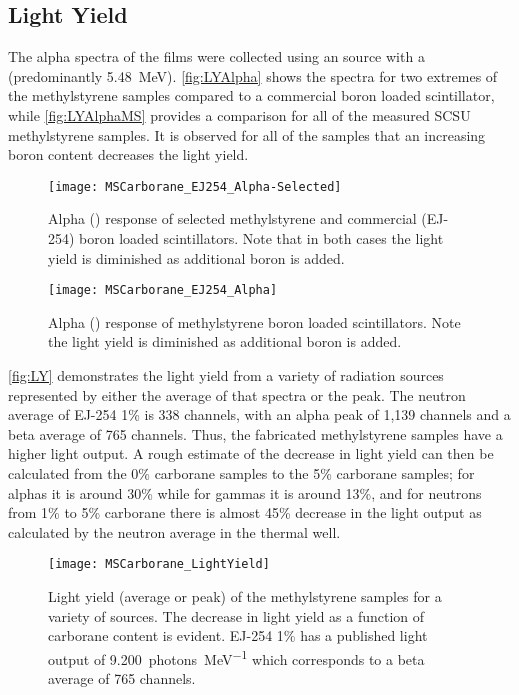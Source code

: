 \documentclass[draftcls,onecolumn]{IEEEtran}
\begin{document}
\subsection{Light Yield}

The alpha spectra of the films were collected using an  source with a (predominantly \SI{5.48}{\MeV}).
\autoref{fig:LYAlpha} shows the spectra for two extremes of the methylstyrene samples compared to a commercial boron loaded scintillator, while \autoref{fig:LYAlphaMS} provides a comparison for all of the measured SCSU methylstyrene samples. 
It is observed for all of the samples that an increasing boron content decreases the light yield.
\begin{figure}
  \centering
  \texttt{[image: MSCarborane\_EJ254\_Alpha-Selected]}
  \caption[Alpha Response of Selected Boron Loaded Samples]{Alpha () response of selected methylstyrene and commercial (EJ-254) boron loaded scintillators.  Note that in both cases the light yield is diminished as additional boron is added.}
  \label{fig:LYAlpha}
\end{figure}
\begin{figure}
  \centering
  \texttt{[image: MSCarborane\_EJ254\_Alpha]}
  \caption[Alpha Response of Methylstyrene Boron Loaded Samples]{Alpha () response of methylstyrene boron loaded scintillators.  Note the light yield is diminished as additional boron is added.}
  \label{fig:LYAlphaMS}
\end{figure}
\autoref{fig:LY} demonstrates the light yield from a variety of radiation sources represented by either the average of that spectra or the peak. 
The neutron average of EJ-254 1\% is 338 channels, with an alpha peak of 1,139 channels and a beta average of 765 channels.
Thus, the fabricated methylstyrene samples have a higher light output.
A rough estimate of the decrease in light yield can then be calculated from the 0\% carborane samples to the 5\% carborane samples; for alphas it is around 30\% while for  gammas it is around 13\%, and for neutrons from 1\% to 5\% carborane there is almost 45\% decrease in the light output as calculated by the neutron average in the thermal well.
\begin{figure}
  \centering
  \texttt{[image: MSCarborane\_LightYield]}
  \caption[Light Yield of Methylstyrene Carborane Samples]{Light yield (average or peak) of the methylstyrene samples for a variety of sources.  The decrease in light yield as a function of carborane content is evident. EJ-254 1\% has a published light output of \SI{9,200}{photons\per\MeV} which corresponds to a beta average of 765 channels.} 
  \label{fig:LY}
\end{figure}
\end{document}
